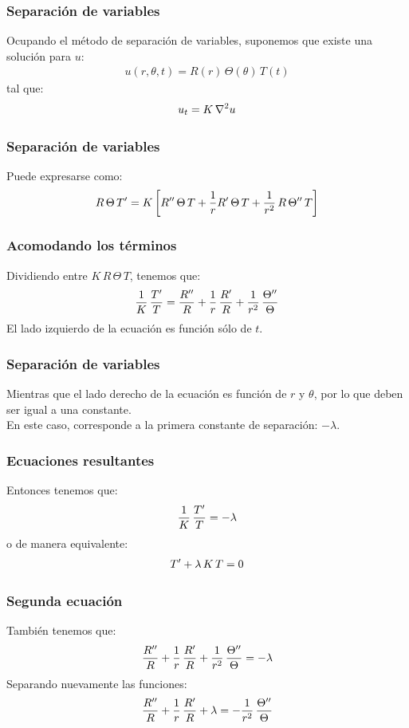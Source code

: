 \documentclass[12pt]{beamer}
\begin{document}
\begin{frame}
\frametitle{Separación de variables}
Ocupando el método de separación de variables, suponemos que existe una solución para $u$: 
\pause
\begin{align*}
    u (r, \theta, t) = R (r) \, \Theta (\theta) \, T (t)
\end{align*}
\pause
tal que:
\begin{align*}
u_{t} = K \, \laplacian{u}
\end{align*}
\end{frame}
\begin{frame}[fragile]
\frametitle{Separación de variables}
Puede expresarse como:
\pause
\begin{align*}
R \, \Theta \, {T}^{\prime} = K \, \bigg[ {R}^{\prime \prime} \, \Theta \, T + \dfrac{1}{r} {R}^{\prime} \, \Theta \, T + \dfrac{1}{r^{2}} \, R \, {\Theta}^{\prime \prime} \, T \bigg]
\end{align*}
\end{frame}
\begin{frame}
\frametitle{Acomodando los términos}
Dividiendo entre $K \, R \, \Theta \, T $, tenemos que:
\pause
\begin{align}
\dfrac{1}{K} \, \dfrac{{T}^{\prime}}{T} = \dfrac{{R}^{\prime \prime}}{R} + \dfrac{1}{r} \, \dfrac{{R}^{\prime}}{R} + \dfrac{1}{r^{2}} \, \dfrac{{\Theta}^{\prime \prime}}{\Theta}
\label{eq:ecuacion_K01}
\end{align}
\pause
El lado izquierdo de la ecuación es función sólo de $t$.
\end{frame}
\begin{frame}
\frametitle{Separación de variables}
Mientras que el lado derecho de la ecuación es función de $r$ y $\theta$, por lo que deben ser igual a una constante.
\\
\bigskip
\pause
En este caso, corresponde a la primera constante de separación: $- \lambda$.
\end{frame}
\begin{frame}
\frametitle{Ecuaciones resultantes}
Entonces tenemos que:
\pause
\begin{align*}
\dfrac{1}{K} \, \dfrac{{T}^{\prime}}{T} = - \lambda
\end{align*}
o de manera equivalente:
\pause
\begin{align}
{T}^{\prime} + \lambda \, K \, T = 0
\label{eq:ecuacion_K02}    
\end{align}
\end{frame}
\begin{frame}
\frametitle{Segunda ecuación}
También tenemos que:
\pause
\begin{align*}
\dfrac{{R}^{\prime \prime}}{R} + \dfrac{1}{r} \, \dfrac{{R}^{\prime}}{R} + \dfrac{1}{r^{2}} \, \dfrac{{\Theta}^{\prime \prime}}{\Theta} = - \lambda
\end{align*}
\pause
Separando nuevamente las funciones:
\pause
\begin{align*}
\dfrac{{R}^{\prime \prime}}{R} + \dfrac{1}{r} \, \dfrac{{R}^{\prime}}{R} + \lambda = - \dfrac{1}{r^{2}} \, \dfrac{{\Theta}^{\prime \prime}}{\Theta}
\end{align*}
\end{frame}
\end{document}

